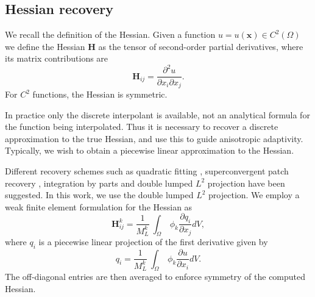 \subsection{Hessian recovery}
We recall the definition of the Hessian.  Given a function
$u=u(\pmb{x}) \in C^2(\Omega)$ we define the Hessian $\pmb{H}$ as the
tensor of second-order partial derivatives, where its matrix
contributions are
\begin{equation} \label{eqn:hessian}
  \pmb{H}_{ij} = \frac{\partial^2u}{\partial x_i \partial x_j}.
\end{equation}
For $C^2$ functions, the Hessian is symmetric.

In practice only the discrete interpolant is available, not
an analytical formula for the function being interpolated. Thus it is
necessary to recover a discrete approximation to the true Hessian, and
use this to guide anisotropic adaptivity. Typically, we wish to obtain
a piecewise linear approximation to the Hessian.

Different recovery schemes such as quadratic fitting
\citep{vallet2007}, superconvergent patch recovery
\citep{zienkiewicz1992}, integration by parts \citep{buscaglia1997}
and double lumped $L^2$ projection \citep{pain2001} have been
suggested. In this work, we use the double lumped $L^2$ projection.
We employ a weak finite element formulation for the Hessian as
\begin{equation*}
\pmb{H}^k_{ij} = \frac{1}{M^{k}_L} \ \int_\Omega \ \phi_k \frac{\partial q_i}{\partial x_j} dV,
\end{equation*}
where $q_i$ is a piecewise linear projection of the first derivative given by
\begin{equation} \label{var_first_derivative}
q_i = \frac{1}{M^{k}_L} \ \int_\Omega \ \phi_k \frac{\partial u}{\partial x_i} dV.
\end{equation}
The off-diagonal entries are then averaged to enforce symmetry of the computed
Hessian.

